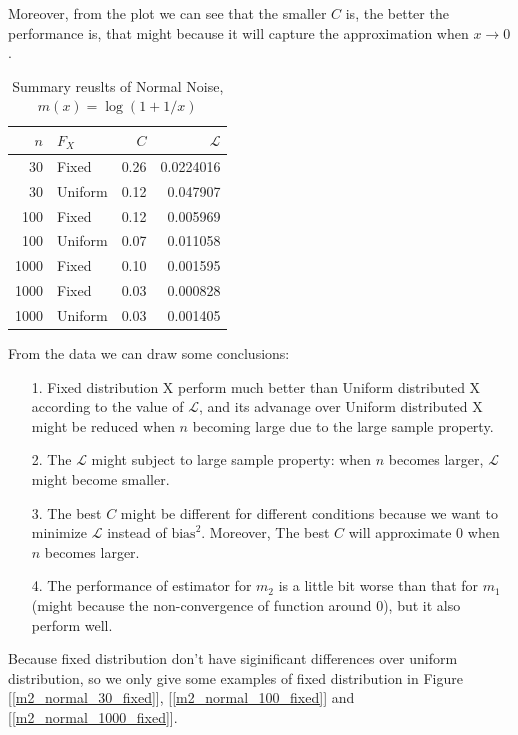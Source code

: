 \documentclass[twoside]{article}
\begin{document}
Moreover, from the plot we can see that the smaller $C$ is, the better the performance is, that might because it will capture the approximation when $x\to 0$.

\begin{table}[ht]
\centering
\caption{Summary reuslts of Normal Noise, $m(x)=\log(1+1/x)$}
\begin{tabular}{rlrr}
  \hline
  $n$ & $F_X$ & $C$ & $\mathcal{L}$ \\ 
  \hline
  30 & Fixed & 0.26 & 0.0224016 \\ 
  30 & Uniform & 0.12 & 0.047907\\ 
  \hline
  100 & Fixed & 0.12 & 0.005969\\
  100 & Uniform & 0.07 & 0.011058\\
  \hline
  1000 & Fixed & 0.10 & 0.001595\\
  1000 & Fixed & 0.03 & 0.000828\\
  1000 & Uniform & 0.03 & 0.001405\\
  \hline
\end{tabular}
\label{cu}
\end{table}

From the data we can draw some conclusions:

\begin{itemize}
  \item[1.] Fixed distribution X perform much better than Uniform distributed X according to the value of $\mathcal{L}$, and its advanage over Uniform distributed X might be reduced when $n$ becoming large due to the large sample property.
  \item[2.] The $\mathcal{L}$ might subject to large sample property: when $n$ becomes larger, $\mathcal{L}$ might become smaller.
  \item[3.] The best $C$ might be different for different conditions because we want to minimize $\mathcal{L}$ instead of $\mathrm{bias}^2$. Moreover, The best $C$ will approximate 0 when $n$ becomes larger.
  \item[4.] The performance of estimator for $m_2$ is a little bit worse than that for $m_1$(might because the non-convergence of function around $0$), but it also perform well.
\end{itemize}


Because fixed distribution don't have siginificant differences over uniform distribution, so we only give some examples of fixed distribution in Figure [\ref{m2_normal_30_fixed}], [\ref{m2_normal_100_fixed}] and [\ref{m2_normal_1000_fixed}].
\end{document}
